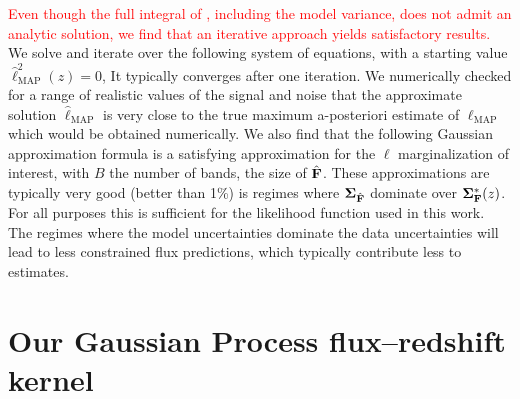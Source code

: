 \documentclass[aps,prd,showpacs,superscriptaddress,groupedaddress]{revtex4}  %
\newcommand{\bl}[1]{\textcolor{red}{#1}}
\begin{document}
\bl{Even though the full integral of , including the model variance, does not admit an analytic solution, we find that an iterative approach yields satisfactory results.}
We solve and iterate over the following system of equations, with a starting value $\hat{\ell}^2_\mathrm{MAP}(z)  = 0$,
It typically converges after one iteration. 
We numerically checked for a range of realistic values of the signal and noise that the approximate solution $\hat{\ell}_\mathrm{MAP}$ is very close to the true maximum a-posteriori estimate of $\ell_\mathrm{MAP}$ which would be obtained numerically. 
We also find that the following Gaussian approximation formula is a satisfying approximation for the $\ell$ marginalization of interest,
with $B$ the number of bands, \ie the size of $\hat{\mat{F}}$.
These approximations are typically very good (better than 1\%) is regimes where $\mat{\Sigma}_{\hat{\mat{F}}}$ dominate over $\mat{\Sigma^*_{{\mat{F}}}}(z)$. 
For all purposes this is sufficient for the likelihood function used in this work. 
The regimes where the model uncertainties dominate the data uncertainties will lead to less constrained flux predictions, which typically contribute less to \photoz estimates. 

\section{Our Gaussian Process flux--redshift kernel}\label{sec:rbfgp}
\end{document}
